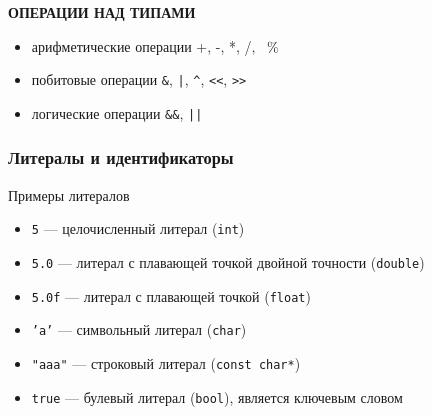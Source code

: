 \begin{figure}[htp]
{
}
\end{figure}
\textbf{ОПЕРАЦИИ НАД ТИПАМИ}
\begin{itemize}
  \item арифметические операции +, -, *, /, \, \%
  \item побитовые операции \texttt{\&}, \texttt{|}, \texttt{\^{}}, \texttt{<<}, \texttt{>>}
  \item логические операции \texttt{\&\&}, \texttt{||}
\end{itemize}
\subsubsection{Литералы и идентификаторы}
\begin{definition}{Примеры литералов}{}
\begin{itemize}
  \item \texttt{5} --- целочисленный литерал (\texttt{int})
  \item \texttt{5.0} --- литерал с плавающей точкой двойной точности (\texttt{double})
  \item \texttt{5.0f} --- литерал с плавающей точкой (\texttt{float})
  \item \texttt{'a'} --- символьный литерал (\texttt{char})
  \item \texttt{"aaa"} --- строковый литерал (\texttt{const char*})
  \item \texttt{true} --- булевый литерал (\texttt{bool}), является ключевым словом
\end{itemize}
\end{definition}

